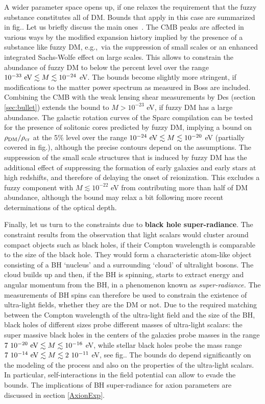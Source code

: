 A wider parameter space opens up, if one relaxes the requirement that the fuzzy substance constitutes all of DM. Bounds that apply in this case are summarized in fig.. Let us briefly discuss the main ones~\cite{FuzzyDMbounds2}. 
The CMB peaks are affected in various ways by the modified expansion history implied by the presence of a substance like fuzzy DM, e.g.,~via the suppression of small scales or an enhanced integrated Sachs-Wolfe effect on large scales. 
This allows to constrain the abundance of fuzzy DM  to below the percent level over the range $10^{-33} \ {\rm eV} \lesssim M \lesssim 10^{-24}$ eV.  The bounds become slightly more stringent, if modifications to the matter power spectrum as measured in {\sc Boss} are included.
Combining the CMB with the weak lensing shear measurements  by {\sc Des} (section \ref{sec:bullet}) extends the bound to $M > 10^{-23}$ eV, if fuzzy DM has a large abundance.
The galactic rotation curves of the {\sc Sparc} compilation can be tested for the presence of solitonic cores predicted by fuzzy DM, implying a bound on $\rho_{\rm DM}/\rho_{\rm cr}$
at the 5\% level over the range $10^{-24} \ {\rm eV} \lesssim M \lesssim 10^{-20}$ eV (partially covered in fig.), although the precise contours depend on the assumptions. 
The suppression of the small scale structures that is induced by fuzzy DM has the additional effect of suppressing the formation of early galaxies and early stars at high redshifts, and therefore of delaying the onset of reionization. 
This excludes a fuzzy component with $M \lesssim 10^{-22}$ eV  from contributing more than half of DM abundance, although the bound may relax a bit following more recent determinations of the optical depth. 



\smallskip

Finally, let us turn to the constraints due to {\bf black hole super-radiance}. The constraint results from the observation that light scalars would cluster around compact objects such as black holes, if their Compton wavelength is comparable to the size of the black hole. They would form a characteristic atom-like object consisting of a BH `nucleus' and a surrounding `cloud' of ultralight bosons. The cloud builds up and then, if the BH is spinning, starts to extract energy and angular momentum from the BH, in a phenomenon known as {\em super-radiance.} The measurements of BH spins  can therefore be used to constrain the existence of ultra-light fields, whether they are the DM or not. Due to the required matching between the Compton wavelength of the ultra-light field and the size of the BH, black holes of different sizes probe different masses of ultra-light scalars: the super massive black holes in the centers of the galaxies probe  masses in the range $7~10^{-20} \ {\rm eV} \lesssim M \lesssim 10^{-16}$ eV, while stellar black holes probe the mass range $7~10^{-14} \ {\rm eV} \lesssim M \lesssim 2~10^{-11}$ eV, see fig.. The bounds do depend significantly on the modeling of the process and also on the properties of the ultra-light scalars. 
In particular, self-interactions in the field potential can allow to evade the bounds.  The implications of BH super-radiance for axion parameters are discussed in section \ref{AxionExp}.


